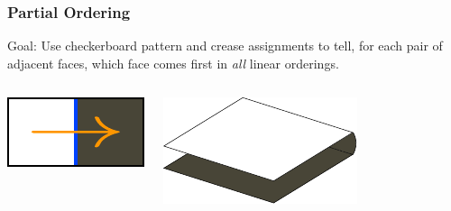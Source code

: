 \documentclass{beamer}
\begin{document}
\begin{frame}
\frametitle{Partial Ordering}
\begin{block}{Goal:}
Use checkerboard pattern and crease assignments to tell, for each pair of adjacent faces, which face comes first in \textit{all} linear orderings.
\end{block}

\bigskip

\begin{columns}[c]
\includegraphics[width=\textwidth]{sam_images/checkerboard-tile-M.pdf}

\includegraphics[width=.9\textwidth]{sam_images/checkerboard-3d.pdf}

\end{columns}

\end{frame}

\end{document}
